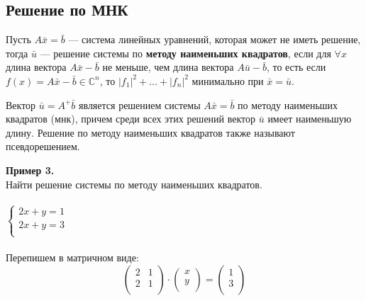 \subsection{Решение по МНК}
\begin{definition}
        Пусть $A\bar x = \bar b$ --- система линейных уравнений, которая может не иметь решение, тогда $\bar u$ --- решение системы по \textbf{методу наименьших квадратов}, если для $\forall x$ длина вектора $A\bar x - \bar b$ не меньше, чем длина вектора $A\bar u - \bar b$, то есть если $f(x)=A\bar x - \bar b \in \mathbb{C}^n$, то $|f_1|^2+...+|f_n|^2$ минимально при $\bar x = \bar u$.
\end{definition}
\begin{theorem}
    Вектор $\bar u = A^+ \bar b$ является решением системы $A\bar x = \bar b$ по методу наименьших квадратов (мнк), причем среди всех этих решений вектор $\bar u$ имеет наименьшую длину. Решение по методу наименьших квадратов также называют псевдорешением.
\end{theorem}
\textbf{Пример 3.}\\ 
Найти решение системы по методу наименьших квадратов.\\ \\
$
\left\{  
\begin{array}{ccl}  
2x+y=1\\
2x+y=3\\
\end{array}   
\right.  
$
\\ 
\\Перепишем в матричном виде:\\
\[\begin{pmatrix}
2 & 1 \\         
2 & 1 \\
\end{pmatrix} \cdot \begin{pmatrix}
x \\         
y \\
\end{pmatrix} = \begin{pmatrix}
1 \\         
3 \\
\end{pmatrix}\]\\
